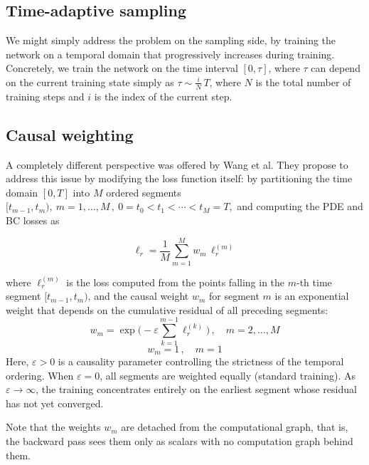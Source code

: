 \subsection{Time-adaptive sampling}
We might simply address the problem on the sampling side,
by training the network on a temporal domain that progressively increases during training.
Concretely, we train the network on the time interval
$[0,\tau]$, where $\tau$ can depend on the current training state simply as
$\tau\sim \frac{i}{N}\,T$, where $N$ is the total number of training steps and $i$ is the index of the current step.
\cite{time_adaptive_pinns}


\subsection{Causal weighting}

A completely different perspective was offered by Wang et al.\cite{experts_guide}
They propose to address this issue by modifying the loss function itself:
by partitioning the time domain $[0,T]$ into $M$ ordered segments
$[t_{m-1}, t_m),\:m=1,\dots,M\,,\:
0 = t_0 < t_1 < \cdots < t_M = T,
$ and computing the PDE and BC losses as

$$
\ell_{r} = \frac{1}{M}\sum_{m=1}^{M} w_m\, \ell_{r}^{(m)}
$$

where
$\ell_{r}^{(m)}$
is the loss computed from the points falling in the $m$-th time segment $[t_{m-1}, t_m)$, 
and the causal weight $w_m$ for segment $m$ is an exponential weight that depends on the cumulative residual of all preceding segments:
$$
w_m = \exp\!\Biggl(-\varepsilon \sum_{k=1}^{m-1} \ell_{r}^{(k)}\Biggr)
\,,\quad m=2,\dots,M
$$
$$
w_m = 1
\,,\quad m=1
$$
Here, $\varepsilon > 0$ is a causality parameter controlling the strictness of the temporal ordering.
When $\varepsilon = 0$, all segments are weighted equally (standard training).
As $\varepsilon \to \infty$, the training concentrates entirely on the earliest segment whose residual has not yet converged.


Note that the weights $w_m$ are detached from the computational graph, that is, the backward pass sees them only as scalars with no computation graph behind them.


